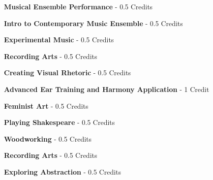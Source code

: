 \vspace{3mm}\noindent\textbf{Musical Ensemble Performance}  - 0.5 Credits

\vspace{3mm}\noindent\textbf{Intro to Contemporary Music Ensemble}  - 0.5 Credits

\vspace{3mm}\noindent\textbf{Experimental Music}  - 0.5 Credits

\vspace{3mm}\noindent\textbf{Recording Arts}  - 0.5 Credits

\vspace{3mm}\noindent\textbf{Creating Visual Rhetoric}  - 0.5 Credits

\vspace{3mm}\noindent\textbf{Advanced Ear Training and Harmony Application}  - 1 Credit

\vspace{3mm}\noindent\textbf{Feminist Art}  - 0.5 Credits


\vspace{3mm}\noindent\textbf{Playing Shakespeare}  - 0.5 Credits

\vspace{3mm}\noindent\textbf{Woodworking}  - 0.5 Credits

\vspace{3mm}\noindent\textbf{Recording Arts}  - 0.5 Credits

\vspace{3mm}\noindent\textbf{Exploring Abstraction}  - 0.5 Credits

\vspace{3mm}